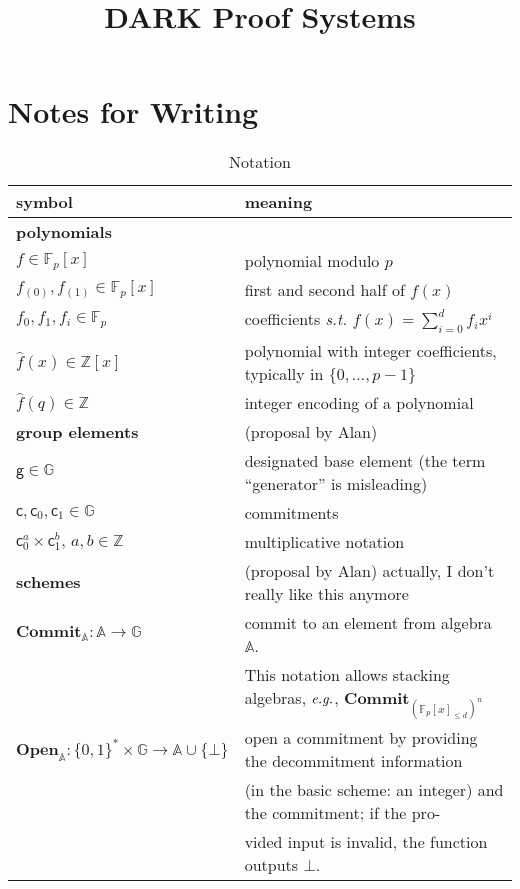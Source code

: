 \documentclass{article}
\begin{document}
\title{DARK Proof Systems}
\maketitle

\section*{Notes for Writing}
\begin{table}
    \caption{Notation}
    \label{tab:notation}
    \centering
    \begin{tabular}{l|l}
        symbol & meaning   \\ \hline \hline
        {\bf polynomials} & \\ \hline
        $f \in \mathbb{F}_p[x]$ & polynomial modulo $p$ \\
        $f_{(0)}, f_{(1)} \in \mathbb{F}_p[x]$ & first and second half of $f(x)$ \\
        $f_0, f_1, f_i \in \mathbb{F}_p$ & coefficients \emph{s.t.} $f(x) = \sum_{i=0}^d f_ix^i$ \\
        $\hat{f}(x) \in \mathbb{Z}[x]$ & polynomial with integer coefficients, typically in $\{0,\ldots,p-1\}$ \\ 
        $\hat{f}(q) \in \mathbb{Z}$ & integer encoding of a polynomial \\ \hline
        {\bf group elements} & (proposal by Alan) \\ \hline
        $\mathsf{g} \in \mathbb{G}$ & designated base element (the term ``generator'' is misleading) \\
        $\mathsf{c}, \mathsf{c}_0, \mathsf{c}_1 \in \mathbb{G}$ & commitments \\
        $\mathsf{c}_0^a \times \mathsf{c}_1^b, \, a, b \in \mathbb{Z}$ & multiplicative notation \\ \hline
        {\bf schemes} & (proposal by Alan) {actually, I don't really like this anymore} \\ \hline
        $\mathbf{Commit}_{\mathbb{A}} : \mathbb{A} \rightarrow \mathbb{G}$ & commit to an element from algebra $\mathbb{A}$. \\
         & This notation allows stacking algebras, $\emph{e.g.}$, $\mathbf{Commit}_{(\mathbb{F}_p[x]_{\leq d})^n}$ \\
        $\mathbf{Open}_\mathbb{A} : \{0,1\}^* \times \mathbb{G} \rightarrow \mathbb{A} \cup \{\bot\}$ & open a commitment by providing the decommitment information \\
         & (in the basic scheme: an integer) and the commitment; if the pro- \\
         & vided input is invalid, the function outputs $\bot$.\\
    \end{tabular}
\end{table}
\end{document}
